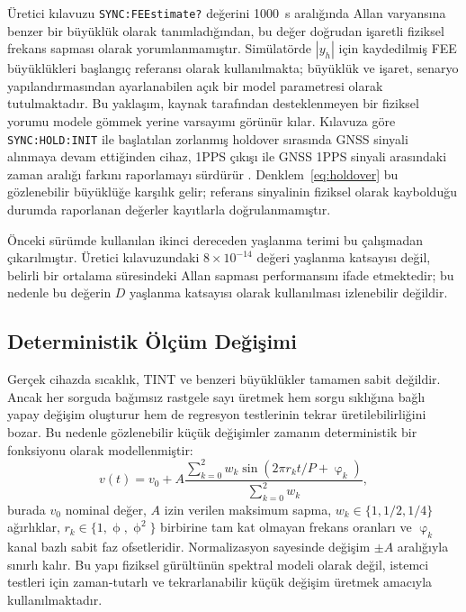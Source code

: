 \documentclass[9pt,twocolumn,a4paper]{extarticle}
\begin{document}
Üretici kılavuzu \texttt{SYNC:FEEstimate?} değerini 1000~s aralığında Allan varyansına benzer bir büyüklük olarak tanımladığından, bu değer doğrudan işaretli fiziksel frekans sapması olarak yorumlanmamıştır. Simülatörde $|y_h|$ için kaydedilmiş FEE büyüklükleri başlangıç referansı olarak kullanılmakta; büyüklük ve işaret, senaryo yapılandırmasından ayarlanabilen açık bir model parametresi olarak tutulmaktadır. Bu yaklaşım, kaynak tarafından desteklenmeyen bir fiziksel yorumu modele gömmek yerine varsayımı görünür kılar.
Kılavuza göre \texttt{SYNC:HOLD:INIT} ile başlatılan zorlanmış holdover sırasında GNSS sinyali alınmaya devam ettiğinden cihaz, 1PPS çıkışı ile GNSS 1PPS sinyali arasındaki zaman aralığı farkını raporlamayı sürdürür \cite{jlt2015}. Denklem~\ref{eq:holdover} bu gözlenebilir büyüklüğe karşılık gelir; referans sinyalinin fiziksel olarak kaybolduğu durumda raporlanan değerler kayıtlarla doğrulanmamıştır.

Önceki sürümde kullanılan ikinci dereceden yaşlanma terimi bu çalışmadan çıkarılmıştır. Üretici kılavuzundaki $8\times10^{-14}$ değeri yaşlanma katsayısı değil, belirli bir ortalama süresindeki Allan sapması performansını ifade etmektedir; bu nedenle bu değerin $D$ yaşlanma katsayısı olarak kullanılması izlenebilir değildir.

\subsection{Deterministik Ölçüm Değişimi}
Gerçek cihazda sıcaklık, TINT ve benzeri büyüklükler tamamen sabit değildir. Ancak her sorguda bağımsız rastgele sayı üretmek hem sorgu sıklığına bağlı yapay değişim oluşturur hem de regresyon testlerinin tekrar üretilebilirliğini bozar. Bu nedenle gözlenebilir küçük değişimler zamanın deterministik bir fonksiyonu olarak modellenmiştir:
\begin{equation}
 v(t)=v_0+A\frac{\sum_{k=0}^{2}w_k\sin\!\left(2\pi r_k t/P+\upvarphi_k\right)}{\sum_{k=0}^{2}w_k},
 \label{eq:variation}
\end{equation}
burada $v_0$ nominal değer, $A$ izin verilen maksimum sapma, $w_k\in\{1,1/2,1/4\}$ ağırlıklar, $r_k\in\{1,\upphi,\upphi^2\}$ birbirine tam kat olmayan frekans oranları ve $\upvarphi_k$ kanal bazlı sabit faz ofsetleridir. Normalizasyon sayesinde değişim $\pm A$ aralığıyla sınırlı kalır. Bu yapı fiziksel gürültünün spektral modeli olarak değil, istemci testleri için zaman-tutarlı ve tekrarlanabilir küçük değişim üretmek amacıyla kullanılmaktadır.
\end{document}
